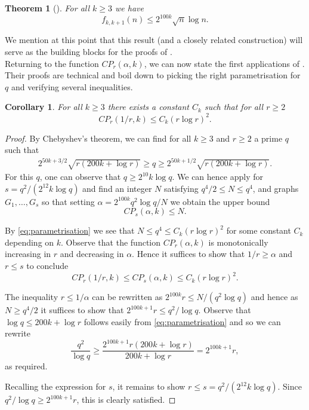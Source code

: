 \documentclass[12pt]{article}
\newtheorem{theorem}{Theorem}
\newtheorem{corollary}{Corollary}
\theoremstyle{definition}
\begin{document}
	\begin{theorem}[\cite{mubayi2024order}]\label{thm:ERupperbound}
		For all $k \geq 3$ we have
		\[f_{k,k+1}(n) \leq 2^{100k}\sqrt{n}\log n.\]
	\end{theorem}
	
	We mention at this point that this result (and a closely related construction) will serve as the building blocks for the proofs of . \\
	
	Returning to the function $CP_r(\alpha,k)$, we can now state the first applications of . Their proofs are technical and boil down to picking the right parametrisation for $q$ and verifying several inequalities.
	
	\begin{corollary}\label{cor:CP1}
		For all $k \geq 3$ there exists a constant $C_k$ such that for all $r \geq 2$
		\[CP_r(1/r,k) \leq C_k (r\log r)^{2}.\]
	\end{corollary} 
	
	\begin{proof}
		By Chebyshev's theorem, we can find for all $k \geq 3$ and $r \geq 2$ a prime $q$ such that
		\begin{align}\label{eq:parametrisation}
			2^{50k+3/2}\sqrt{r(200k+\log r)} \geq q \geq 2^{50k+1/2}\sqrt{r(200k+\log r)}.
		\end{align}
		For this $q$, one can observe that $q \geq 2^{10}k\log q$. We can hence apply  for $s = q^2/(2^{12}k\log q)$ and find an integer $N$ satisfying $q^4/2 \leq N \leq q^4$, and graphs $G_1,\dots,G_s$ so that setting $\alpha = 2^{100k}q^2\log q/N$ we obtain the upper bound
		\[CP_s(\alpha,k) \leq N.\]
		
		By \eqref{eq:parametrisation} we see that $N \leq q^4 \leq C_k(r\log r)^2$ for some constant $C_k$ depending on $k$. Observe that the function $CP_r(\alpha,k)$ is monotonically increasing in $r$ and decreasing in $\alpha$. Hence it suffices to show that $1/r \geq \alpha$ and $r \leq s$ to conclude
		\[CP_r(1/r,k) \leq CP_s(\alpha,k) \leq C_k(r\log r)^2.\]
		
		The inequality $r \leq 1/\alpha$ can be rewritten as $2^{100k}r \leq N/(q^2\log q)$ and hence as $N \geq q^4/2$ it suffices to show that $2^{100k+1}r \leq q^2/\log q$. Observe that $\log q \leq 200k+\log r$ follows easily from \eqref{eq:parametrisation} and so we can rewrite
		\[\frac{q^2}{\log q} \geq \frac{2^{100k+1}r(200k+\log r)}{200k+\log r} = 2^{100k+1}r, \]
		as required.
		
		Recalling the expression for $s$, it remains to show $r \leq s = q^2/(2^{12}k\log q)$. Since $q^2/\log q \geq 2^{100k+1}r$, this is clearly satisfied.
	\end{proof}
	
\end{document}
